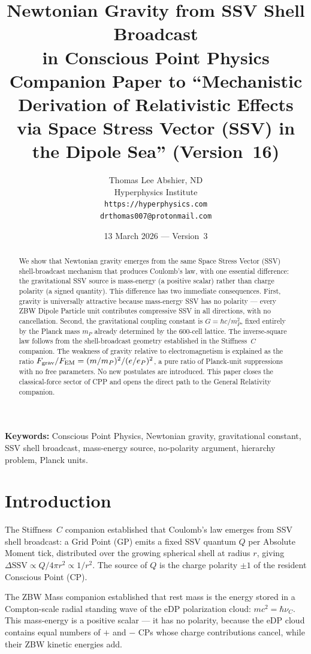\documentclass[12pt]{article}
\title{\textbf{Newtonian Gravity from SSV Shell Broadcast\\
in Conscious Point Physics}\\[6pt]
{\large Companion Paper to ``Mechanistic Derivation of Relativistic Effects\\
via Space Stress Vector (SSV) in the Dipole Sea'' (Version~16)}}
\author{Thomas Lee Abshier, ND\\
Hyperphysics Institute\\
\texttt{https://hyperphysics.com}\\
\texttt{drthomas007@protonmail.com}}
\date{13 March 2026 --- Version~3}
\newcommand{\mP}{m_P}
\newcommand{\eP}{e_P}
\newcommand{\SSV}{\text{SSV}}
\begin{document}
\maketitle

\noindent\textbf{Keywords:} Conscious Point Physics, Newtonian gravity,
gravitational constant, SSV shell broadcast, mass-energy source,
no-polarity argument, hierarchy problem, Planck units.

\begin{abstract}
We show that Newtonian gravity emerges from the same Space Stress Vector
(SSV) shell-broadcast mechanism that produces Coulomb's law, with one
essential difference: the gravitational SSV source is mass-energy (a
positive scalar) rather than charge polarity (a signed quantity).  This
difference has two immediate consequences.  First, gravity is universally
attractive because mass-energy SSV has no polarity --- every ZBW Dipole
Particle unit contributes compressive SSV in all directions, with no
cancellation.  Second, the gravitational coupling constant is $G =
\hbar c/\mP^2$, fixed entirely by the Planck mass $\mP$ already determined
by the 600-cell lattice.  The inverse-square law follows from the
shell-broadcast geometry established in the Stiffness~$C$ companion.
The weakness of gravity relative to electromagnetism is explained as the
ratio $F_{\rm grav}/F_{\rm EM} = (m/\mP)^2/(e/\eP)^2$, a pure ratio of
Planck-unit suppressions with no free parameters.  No new postulates are
introduced.  This paper closes the classical-force sector of CPP and opens
the direct path to the General Relativity companion.
\end{abstract}

\section{Introduction}
\label{sec:intro}

The Stiffness~$C$ companion established that Coulomb's law emerges from
SSV shell broadcast: a Grid Point (GP) emits a fixed SSV quantum $Q$ per
Absolute Moment tick, distributed over the growing spherical shell at radius
$r$, giving $\Delta\SSV \propto Q/4\pi r^2 \propto 1/r^2$.  The source of
$Q$ is the charge polarity $\pm1$ of the resident Conscious Point (CP).

The ZBW Mass companion established that rest mass is the energy stored in a
Compton-scale radial standing wave of the eDP polarization cloud: $mc^2 =
\hbar\nu_C$.  This mass-energy is a positive scalar --- it has no polarity,
because the eDP cloud contains equal numbers of $+$ and $-$ CPs whose charge
contributions cancel, while their ZBW kinetic energies add.
\end{document}
